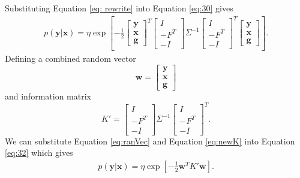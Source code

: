 \documentclass[12pt,oneside,openany,a4paper, %
afrikaans,english,
]{memoir}
\numberwithin{equation}{chapter}
\begin{document}
Substituting Equation \ref{eq: rewrite} into Equation \ref{eq:30} gives
\begin{equation}
\label{eq:32}
\begin{split}
p(\bm{y}|\bm{x}) = \eta\exp\left[-\frac{1}{2}
\begin{bmatrix}
\bm{y}\\
\bm{x}\\
\bm{g}
\end{bmatrix}^T
\begin{bmatrix}
I\\-F^T\\-I
\end{bmatrix}
\Sigma^{-1}
\begin{bmatrix}
I\\-F^T\\-I
\end{bmatrix}^T
\begin{bmatrix}
\bm{y}\\
\bm{x}\\
\bm{g}
\end{bmatrix}
\right].
\end{split}
\end{equation}
Defining a combined random vector
\begin{equation}\label{eq:ranVec}
\bm{w} = 
\begin{bmatrix}
\bm{y}\\
\bm{x}\\
\bm{g}

\end{bmatrix}
\end{equation}
and information matrix
\begin{equation}\label{eq:newK}
K' =
\begin{bmatrix}
I\\-F^T\\-I
\end{bmatrix}
\Sigma^{-1}
\begin{bmatrix}
I\\-F^T\\-I
\end{bmatrix}^T.
\end{equation}
We can substitute Equation \ref{eq:ranVec} and Equation \ref{eq:newK} into Equation \ref{eq:32} which gives
\begin{equation}
\label{eq:35}
\begin{split}
p(\bm{y}|\bm{x}) = \eta\exp\left[-\frac{1}{2}
\bm{w}^T
K'
\bm{w}
\right].
\end{split}
\end{equation}
\end{document}
